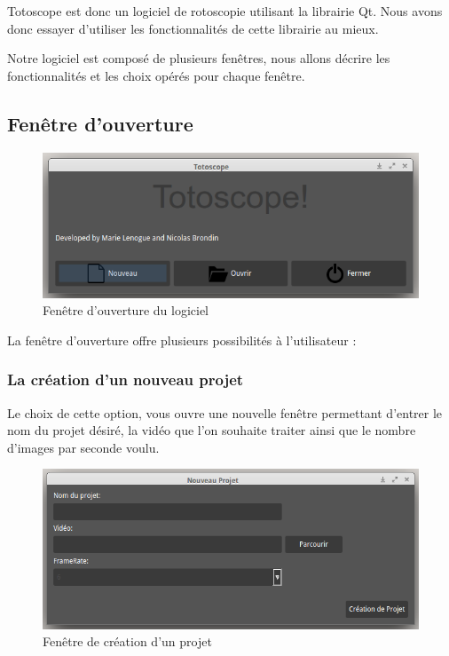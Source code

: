 
Totoscope est donc un logiciel de rotoscopie utilisant la librairie Qt. Nous avons donc essayer d'utiliser les fonctionnalités de cette librairie au mieux.

Notre logiciel est composé de plusieurs fenêtres, nous allons  décrire les fonctionnalités et les choix opérés pour chaque fenêtre.

\subsection{Fenêtre d'ouverture}

	\begin{figure}[!h]
		\centering
		\includegraphics[scale=0.5]{./figures/opening.png}
		\caption{Fenêtre d'ouverture du logiciel}
	\end{figure}

	La fenêtre d'ouverture offre plusieurs possibilités à l'utilisateur : 
	
	\subsubsection*{La création d'un nouveau projet}
			Le choix de cette option, vous ouvre une nouvelle fenêtre permettant d'entrer le nom du projet désiré, la vidéo que l'on souhaite traiter ainsi que le nombre d'images par seconde voulu.
			
			\vspace{0,5cm}
			
	\begin{figure}[h]
		\centering
		\includegraphics[scale=0.5]{./figures/new.png}
		\caption{Fenêtre de création d'un projet}
	\end{figure}	
	
